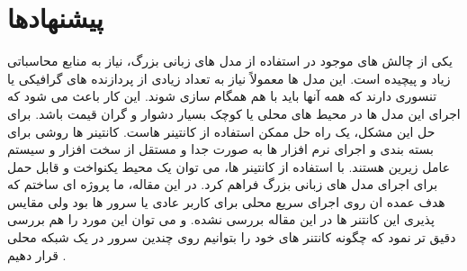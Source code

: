 \section{پیشنهادها}
یکی از چالش های موجود در استفاده از مدل های زبانی بزرگ، نیاز به منابع محاسباتی زیاد و پیچیده است. این مدل ها معمولاً نیاز به تعداد زیادی از پردازنده های گرافیکی یا تنسوری دارند که همه آنها باید با هم همگام سازی شوند. این کار باعث می شود که اجرای این مدل ها در محیط های محلی یا کوچک بسیار دشوار و گران قیمت باشد. برای حل این مشکل، یک راه حل ممکن استفاده از کانتینر هاست. کانتینر ها روشی برای بسته بندی و اجرای نرم افزار ها به صورت جدا و مستقل از سخت افزار و سیستم عامل زیرین هستند. با استفاده از کانتینر ها، می توان یک محیط یکنواخت و قابل حمل برای اجرای مدل های زبانی بزرگ فراهم کرد. در این مقاله، ما پروژه ای ساختم که هدف عمده ان روی اجرای سریع محلی برای کاربر عادی یا سرور ها بود ولی مقایس پذیری این کانتنر ها در این مقاله بررسی نشده. و می توان این مورد را هم بررسی دقیق تر نمود که چگونه کانتنر های خود را بتوانیم روی چندین سرور در یک شبکه محلی قرار دهیم \cite{tamiru2020experimental}.